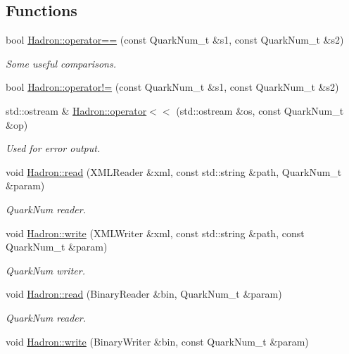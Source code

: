 \subsection*{Functions}
\begin{DoxyCompactItemize}
\item 
bool \mbox{\hyperlink{namespaceHadron_a6a6810ed7f262fbb4167534023c0b191}{Hadron\+::operator==}} (const Quark\+Num\+\_\+t \&s1, const Quark\+Num\+\_\+t \&s2)
\begin{DoxyCompactList}\small\item\em Some useful comparisons. \end{DoxyCompactList}\item 
bool \mbox{\hyperlink{namespaceHadron_aa7483984b4c081a23ba486c97ca05f5a}{Hadron\+::operator!=}} (const Quark\+Num\+\_\+t \&s1, const Quark\+Num\+\_\+t \&s2)
\item 
std\+::ostream \& \mbox{\hyperlink{namespaceHadron_a99d886a5455746fba4c549c7a072c731}{Hadron\+::operator$<$$<$}} (std\+::ostream \&os, const Quark\+Num\+\_\+t \&op)
\begin{DoxyCompactList}\small\item\em Used for error output. \end{DoxyCompactList}\item 
void \mbox{\hyperlink{namespaceHadron_a9fc0b61edf5216d1720dabf68810d3b5}{Hadron\+::read}} (X\+M\+L\+Reader \&xml, const std\+::string \&path, Quark\+Num\+\_\+t \&param)
\begin{DoxyCompactList}\small\item\em Quark\+Num reader. \end{DoxyCompactList}\item 
void \mbox{\hyperlink{namespaceHadron_a7da51caa70247c9ab9d11f8275ec93b7}{Hadron\+::write}} (X\+M\+L\+Writer \&xml, const std\+::string \&path, const Quark\+Num\+\_\+t \&param)
\begin{DoxyCompactList}\small\item\em Quark\+Num writer. \end{DoxyCompactList}\item 
void \mbox{\hyperlink{namespaceHadron_a1f04a3926b07155fbf7e7887169d7f4e}{Hadron\+::read}} (Binary\+Reader \&bin, Quark\+Num\+\_\+t \&param)
\begin{DoxyCompactList}\small\item\em Quark\+Num reader. \end{DoxyCompactList}\item 
void \mbox{\hyperlink{namespaceHadron_a44eb64f50cbbc947364a538026c97ee6}{Hadron\+::write}} (Binary\+Writer \&bin, const Quark\+Num\+\_\+t \&param)

\end{DoxyCompactItemize}
